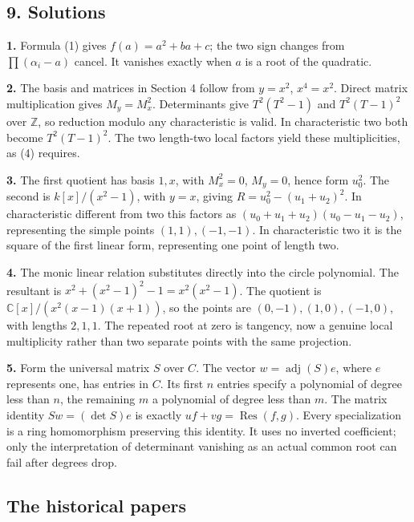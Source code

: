 \documentclass[
]{article}
\begin{document}
\subsection{9. Solutions}\label{solutions}

\textbf{1.} Formula (1) gives \(f(a)=a^2+ba+c\); the two sign changes
from \(\prod(\alpha_i-a)\) cancel. It vanishes exactly when \(a\) is a
root of the quadratic.

\textbf{2.} The basis and matrices in Section 4 follow from \(y=x^2\),
\(x^4=x^2\). Direct matrix multiplication gives \(M_y=M_x^2\).
Determinants give \(T^2(T^2-1)\) and \(T^2(T-1)^2\) over \(\mathbb Z\),
so reduction modulo any characteristic is valid. In characteristic two
both become \(T^2(T-1)^2\). The two length-two local factors yield these
multiplicities, as (4) requires.

\textbf{3.} The first quotient has basis \(1,x\), with \(M_x^2=0\),
\(M_y=0\), hence form \(u_0^2\). The second is \(k[x]/(x^2-1)\), with
\(y=x\), giving \(R=u_0^2-(u_1+u_2)^2\). In characteristic different
from two this factors as \((u_0+u_1+u_2)(u_0-u_1-u_2)\), representing
the simple points \((1,1),(-1,-1)\). In characteristic two it is the
square of the first linear form, representing one point of length two.

\textbf{4.} The monic linear relation substitutes directly into the
circle polynomial. The resultant is \(x^2+(x^2-1)^2-1=x^2(x^2-1)\). The
quotient is \(\mathbb C[x]/(x^2(x-1)(x+1))\), so the points are
\((0,-1),(1,0),(-1,0)\), with lengths \(2,1,1\). The repeated root at
zero is tangency, now a genuine local multiplicity rather than two
separate points with the same projection.

\textbf{5.} Form the universal matrix \(S\) over \(C\). The vector
\(w=\operatorname{adj}(S)e\), where \(e\) represents one, has entries in
\(C\). Its first \(n\) entries specify a polynomial of degree less than
\(n\), the remaining \(m\) a polynomial of degree less than \(m\). The
matrix identity \(Sw=(\det S)e\) is exactly
\(uf+vg=\operatorname{Res}(f,g)\). Every specialization is a ring
homomorphism preserving this identity. It uses no inverted coefficient;
only the interpretation of determinant vanishing as an actual common
root can fail after degrees drop.

\subsection{The historical papers}\label{the-historical-papers}
\end{document}
